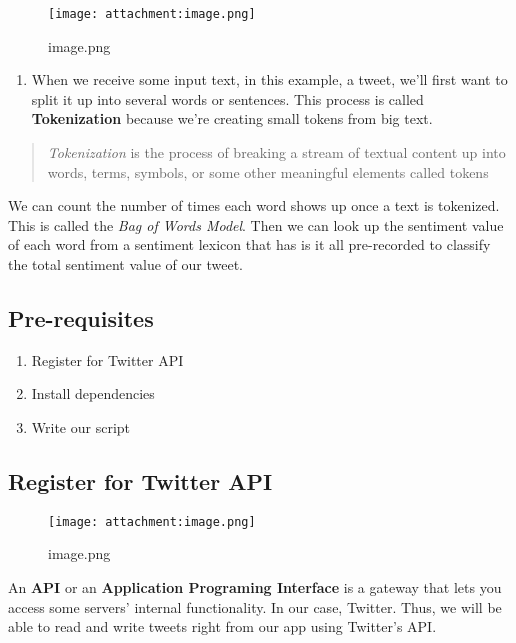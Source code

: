 \documentclass[11pt]{article}
\makeatletter
\def\maxwidth{\ifdim\Gin@nat@width>\linewidth\linewidth
    \else\Gin@nat@width\fi}
\let\Oldincludegraphics\includegraphics
\renewcommand{\includegraphics}[1]{\Oldincludegraphics[width=.8\maxwidth]{#1}}
\providecommand{\tightlist}{%
      \setlength{\itemsep}{0pt}\setlength{\parskip}{0pt}}
\makeatother
\begin{document}
    \begin{figure}
\centering
\texttt{[image: attachment:image.png]}
\caption{image.png}
\end{figure}

    \begin{enumerate}
\def\labelenumi{\arabic{enumi}.}
\tightlist
\item
  When we receive some input text, in this example, a tweet, we'll first
  want to split it up into several words or sentences. This process is
  called \textbf{Tokenization} because we're creating small tokens from
  big text.
\end{enumerate}

    \begin{quote}
\emph{Tokenization} is the process of breaking a stream of textual
content up into words, terms, symbols, or some other meaningful elements
called tokens
\end{quote}

    We can count the number of times each word shows up once a text is
tokenized. This is called the \emph{Bag of Words Model}. Then we can
look up the sentiment value of each word from a sentiment lexicon that
has is it all pre-recorded to classify the total sentiment value of our
tweet.

    \subsection{Pre-requisites}\label{pre-requisites}

    \begin{enumerate}
\def\labelenumi{\arabic{enumi}.}
\tightlist
\item
  Register for Twitter API
\item
  Install dependencies
\item
  Write our script
\end{enumerate}

    \subsection{Register for Twitter API}\label{register-for-twitter-api}

    \begin{figure}
\centering
\texttt{[image: attachment:image.png]}
\caption{image.png}
\end{figure}

    An \textbf{API} or an \textbf{Application Programing Interface} is a
gateway that lets you access some servers' internal functionality. In
our case, Twitter. Thus, we will be able to read and write tweets right
from our app using Twitter's API.
\end{document}
